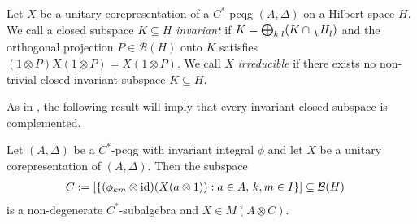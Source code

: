 \begin{Def}
Let $X$ be a unitary corepresentation of a $C^{*}$-pcqg $(A,\Delta)$ on a
  Hilbert space $H$. We call a closed subspace $K\subseteq H$
  \emph{invariant} if $K=\bigoplus_{k,l} (K \cap \Grd{H}{k}{l})$ %
  and
  the orthogonal projection $P\in \mathcal{B}(H)$ onto $K$ satisfies
  $(1\otimes P)X(1\otimes P)=X(1\otimes P)$.  We call $X$
  \emph{irreducible} if there exists no non-trivial closed invariant
  subspace $K\subseteq H$.
\end{Def}
As in \cite{MVD1}, the  following result will imply that every invariant closed subspace is complemented.
 \begin{Prop}\label{prop:corep-complemented}
   Let $(A,\Delta)$ be a $C^{*}$-pcqg with invariant integral $\phi$ and
   let $X$ be a unitary corepresentation of $(A,\Delta)$. Then the
   subspace %
   \begin{align*}
     C &:= [ \{(\phi_{km} \otimes
     \operatorname{id})(X(a\otimes 1)) : a \in A,\, k,m\in I\}] \subseteq \mathcal{B}(H)
   \end{align*}
   is a non-degenerate $C^{*}$-subalgebra and $X\in M(A\otimes C)$.
 \end{Prop}
